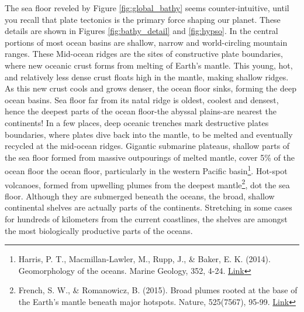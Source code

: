 The sea floor reveled by Figure \ref{fig:global_bathy} seems counter-intuitive, until you recall that plate tectonics is the primary force shaping our planet. These details are shown in Figures \ref{fig:bathy_detail} and \ref{fig:hypso}. In the central portions of most ocean basins are shallow, narrow and world-circling mountain ranges. These Mid-ocean ridges are the sites of constructive plate boundaries, where new oceanic crust forms from melting of Earth's mantle. This young, hot, and relatively less dense crust floats high in the mantle, making shallow ridges. As this new crust cools and grows denser, the ocean floor sinks, forming the deep ocean basins. Sea floor far from its natal ridge is oldest, coolest and densest, hence the deepest parts of the ocean floor-the abyssal plains-are nearest the continents! In a few places, deep oceanic trenches mark destructive plates boundaries, where plates dive back into the mantle, to be melted and eventually recycled at the mid-ocean ridges. Gigantic submarine plateaus, shallow parts of the sea floor formed from massive outpourings of melted mantle, cover 5\% of the ocean floor the ocean floor, particularly in the western Pacific basin\footnote{Harris, P. T., Macmillan-Lawler, M., Rupp, J., \& Baker, E. K. (2014). Geomorphology of the oceans. Marine Geology, 352, 4-24. \href{https://doi.org/10.1016/j.margeo.2014.01.011}{Link}}. Hot-spot volcanoes, formed from upwelling plumes from the deepest mantle\footnote{French, S. W., \& Romanowicz, B. (2015). Broad plumes rooted at the base of the Earth's mantle beneath major hotspots. Nature, 525(7567), 95-99. \href{https://doi.org/10.1038/nature14876}{Link}}, dot the sea floor. Although they are submerged beneath the oceans, the broad, shallow continental shelves are actually parts of the continents. Stretching in some cases for hundreds of kilometers from the current coastlines, the shelves are amongst the most biologically productive parts of the oceans.      
        

